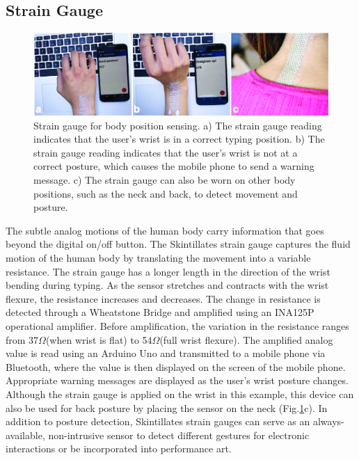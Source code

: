 \documentclass{sigchi}
\begin{document}
\subsection {Strain Gauge}
\begin{figure}
\centering
\includegraphics[width=1.0\textwidth]{figures/Figure10}
\caption{Strain gauge for body position sensing. a) The strain gauge reading indicates that the user's wrist is in a correct typing position. b) The strain gauge reading indicates that the user's wrist is not at a correct posture, which causes the mobile phone to send a warning message. c) The strain gauge can also be worn on other body positions, such as the neck and back, to detect movement and posture.}
\vspace{-8pt}
\label{fig:straingauge}
\end{figure}
The subtle analog motions of the human body carry information that goes beyond the digital on/off button. The Skintillates strain gauge captures the fluid motion of the human body by translating the movement into a variable resistance. 
 The strain gauge has a longer length in the direction of the wrist bending during typing. As the sensor stretches and contracts with the wrist flexure, the resistance increases and decreases. The change in resistance is detected through a Wheatstone Bridge and amplified using an INA125P operational amplifier. Before amplification, the variation in the resistance ranges from 37$\Omega$(when wrist is flat) to 54$\Omega$(full wrist flexure). The amplified analog value is read using an Arduino Uno and transmitted to a mobile phone via Bluetooth, where the value is then displayed on the screen of the mobile phone. Appropriate warning messages are displayed as the user’s wrist posture changes. Although the strain gauge is applied on the wrist in this example, this device can also be used for back posture by placing the sensor on the neck (Fig.\ref{fig:straingauge}c). In addition to posture detection, Skintillates strain gauges can serve as an always-available, non-intrusive sensor to detect different gestures for electronic interactions or be incorporated into performance art. 
\end{document}
